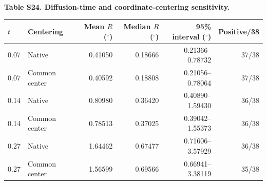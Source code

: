 {\fontsize{10}{13}\selectfont\textbf{Table S24. Diffusion-time and coordinate-centering sensitivity.}}\par\smallskip
\begingroup
{}\fontsize{8.7}{11.5}\selectfont
\setlength{\tabcolsep}{4pt}
\begin{tabular*}{\linewidth}{@{\extracolsep{\fill}}llrrrr@{}}
\toprule
$t$ & Centering & Mean $R$ ($^\circ$) & Median $R$ ($^\circ$) & 95\% interval ($^\circ$) & Positive/38 \\
\midrule
0.07 & Native & 0.41050 & 0.18666 & 0.21366--0.78732 & 37/38 \\
0.07 & Common center & 0.40592 & 0.18808 & 0.21056--0.78064 & 37/38 \\
0.14 & Native & 0.80980 & 0.36420 & 0.40890--1.59430 & 36/38 \\
0.14 & Common center & 0.78513 & 0.37025 & 0.39042--1.55373 & 36/38 \\
0.27 & Native & 1.64462 & 0.67477 & 0.71606--3.57929 & 36/38 \\
0.27 & Common center & 1.56599 & 0.69566 & 0.66941--3.38119 & 35/38 \\
\bottomrule
\end{tabular*}